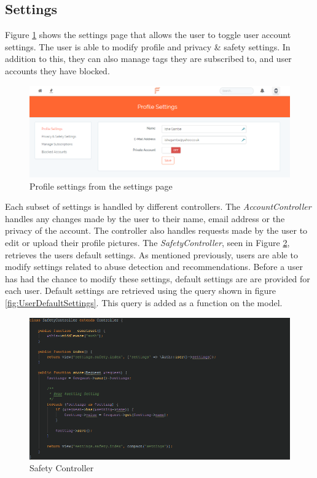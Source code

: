 \subsection{Settings}
Figure \ref{fig:SettingsImplementation} shows the settings page that allows the user to toggle user account settings. The user is able to modify profile and privacy \& safety settings. In addition to this, they can also manage tags they are subscribed to, and user accounts they have blocked.

\begin{figure}[H]
\centering
\includegraphics[width=\textwidth]{Images/Implementation/SettingsPage}
\caption{Profile settings from the settings page}
\label{fig:SettingsImplementation}
\end{figure}

Each subset of settings is handled by different controllers. The \textit{AccountController} handles any changes made by the user to their name, email address or the privacy of the account. The controller also handles requests made by the user to edit or upload their profile pictures. The \textit{SafetyController}, seen in Figure \ref{fig:SafetyController}, retrieves the users default settings. As mentioned previously, users are able to modify settings related to abuse detection and recommendations. Before a user has had the chance to modify these settings, default settings are are provided for each user. Default settings are retrieved using the query shown in figure \ref{fig:UserDefaultSettings}. This query is added as a function on the model.

\begin{figure}[H]
\centering
\includegraphics[width=\textwidth]{Images/Implementation/SafetyController}
\caption{Safety Controller}
\label{fig:SafetyController}
\end{figure}

